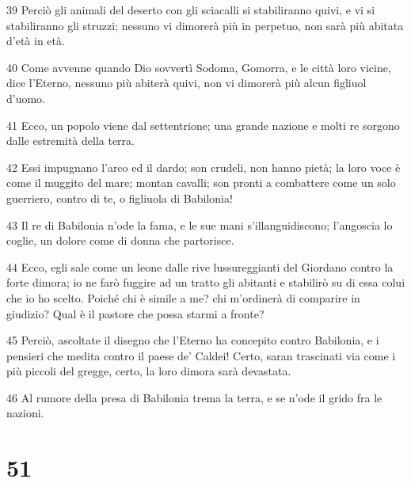 \par 39 Perciò gli animali del deserto con gli sciacalli si stabiliranno quivi, e vi si stabiliranno gli struzzi; nessuno vi dimorerà più in perpetuo, non sarà più abitata d'età in età.
\par 40 Come avvenne quando Dio sovvertì Sodoma, Gomorra, e le città loro vicine, dice l'Eterno, nessuno più abiterà quivi, non vi dimorerà più alcun figliuol d'uomo.
\par 41 Ecco, un popolo viene dal settentrione; una grande nazione e molti re sorgono dalle estremità della terra.
\par 42 Essi impugnano l'arco ed il dardo; son crudeli, non hanno pietà; la loro voce è come il muggito del mare; montan cavalli; son pronti a combattere come un solo guerriero, contro di te, o figliuola di Babilonia!
\par 43 Il re di Babilonia n'ode la fama, e le sue mani s'illanguidiscono; l'angoscia lo coglie, un dolore come di donna che partorisce.
\par 44 Ecco, egli sale come un leone dalle rive lussureggianti del Giordano contro la forte dimora; io ne farò fuggire ad un tratto gli abitanti e stabilirò su di essa colui che io ho scelto. Poiché chi è simile a me? chi m'ordinerà di comparire in giudizio? Qual è il pastore che possa starmi a fronte?
\par 45 Perciò, ascoltate il disegno che l'Eterno ha concepito contro Babilonia, e i pensieri che medita contro il paese de' Caldei! Certo, saran trascinati via come i più piccoli del gregge, certo, la loro dimora sarà devastata.
\par 46 Al rumore della presa di Babilonia trema la terra, e se n'ode il grido fra le nazioni.

\chapter{51}

